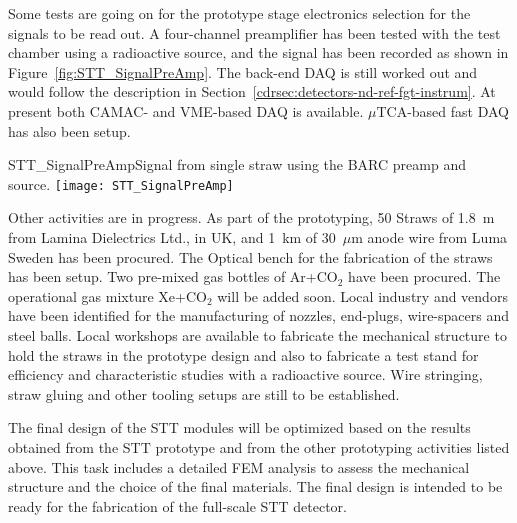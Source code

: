  Some tests are going on for the prototype stage electronics selection
for the signals to be read out.  A four-channel preamplifier has been
tested with the test chamber using a radioactive source, and the signal
has been recorded as shown in Figure~\ref{fig:STT_SignalPreAmp}.  The
back-end DAQ is still worked out  and would follow the description 
in Section~\ref{cdrsec:detectors-nd-ref-fgt-instrum}. At
present both CAMAC- and VME-based DAQ is available. $\mu$TCA-based fast
DAQ has also been setup. 
\begin{cdrfigure}
{STT_SignalPreAmp}{Signal from single straw using the BARC preamp and source.}
\texttt{[image: STT\_SignalPreAmp]}
\end{cdrfigure}

Other activities are in progress. As part of the prototyping, 50 Straws of 1.8~m from Lamina
Dielectrics Ltd., in UK, and 1~km of 30~$\mu$m anode wire from Luma
Sweden has been procured. The Optical bench for the fabrication of the
straws has been setup.  Two pre-mixed gas bottles of Ar+CO$_2$ have been
procured. The operational gas mixture %
Xe+CO$_2$ will be added
soon. Local industry and vendors have been identified for the
manufacturing of nozzles, end-plugs, wire-spacers and steel
balls. Local workshops are available to fabricate the mechanical
structure to hold the straws in the prototype design and also to
fabricate a test stand for efficiency and characteristic studies  with
a radioactive source. Wire stringing, straw gluing and other tooling
setups are still to be established.


The final design of the STT modules will be optimized based on the
results obtained from the STT prototype and from the other prototyping
activities listed above.  This task includes a detailed FEM analysis to
assess the mechanical structure and the choice of the final
materials. The final design is intended to be ready for the
fabrication of the full-scale STT detector. 



